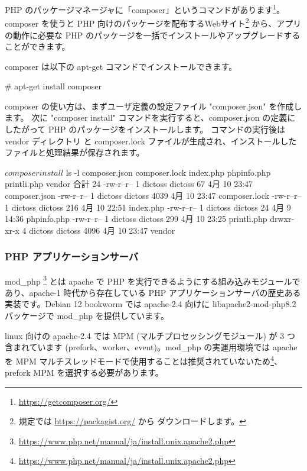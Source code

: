 \documentclass[mingoth,a4paper]{jsarticle}
\begin{document}
PHP のパッケージマネージャに「composer」というコマンドがあります\footnote{\url{https://getcomposer.org/}}。
composer を使うと PHP 向けのパッケージを配布するWebサイト\footnote{規定では \url{https://packagist.org/} から
ダウンロードします。} から、アプリの動作に必要な PHP のパッケージを一括でインストールやアップグレードすることができます。

composer は以下の apt-get コマンドでインストールできます。

\begin{commandline}
# apt-get install composer
\end{commandline}

composer の使い方は、まずユーザ定義の設定ファイル "composer.json" を作成します。
次に "composer install" コマンドを実行すると、composer.json の定義にしたがって PHP のパッケージをインストールします。
コマンドの実行後は vendor ディレクトリ と composer.lock ファイルが生成され、インストールしたファイルと処理結果が保存されます。


\begin{commandline}
$ composer install
$ ls -l
composer.json  composer.lock  index.php  phpinfo.php  printli.php  vendor
合計 24
-rw-r--r-- 1 dictoss dictoss   67  4月 10 23:47 composer.json
-rw-r--r-- 1 dictoss dictoss 4039  4月 10 23:47 composer.lock
-rw-r--r-- 1 dictoss dictoss  216  4月 10 22:51 index.php
-rw-r--r-- 1 dictoss dictoss   24  4月  9 14:36 phpinfo.php
-rw-r--r-- 1 dictoss dictoss  299  4月 10 23:25 printli.php
drwxr-xr-x 4 dictoss dictoss 4096  4月 10 23:47 vendor
\end{commandline}


\subsubsection{PHP アプリケーションサーバ}


mod\_php \footnote{\url{https://www.php.net/manual/ja/install.unix.apache2.php}} とは apache で PHP を実行できるようにする組み込みモジュールであり、apache-1 時代から存在している PHP アプリケーションサーバの歴史ある実装です。Debian 12 bookworm では apache-2.4 向けに libapache2-mod-php8.2 パッケージで mod\_php を提供しています。

linux 向けの apache-2.4 では MPM (マルチプロセッシングモジュール) が 3 つ含まれています (prefork、worker、event)。mod\_php の実運用環境では apache を MPM マルチスレッドモードで使用することは推奨されていないため\footnote{\url{https://www.php.net/manual/ja/install.unix.apache2.php}}、prefork MPM を選択する必要があります。
\end{document}
